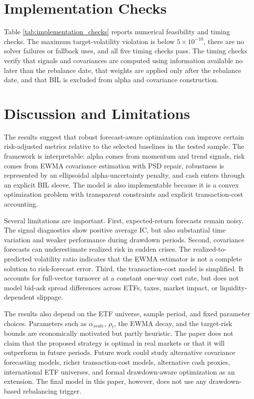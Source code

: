 \documentclass[11pt]{article}
\begin{document}
\section{Implementation Checks}
\label{sec:checks}

\ImplementationChecksTable

Table \ref{tab:implementation_checks} reports numerical feasibility and timing
checks. The maximum target-volatility violation is below \(5\times10^{-10}\), there
are no solver failures or fallback uses, and all five timing checks pass. The timing
checks verify that signals and covariances are computed using information available
no later than the rebalance date, that weights are applied only after the rebalance
date, and that BIL is excluded from alpha and covariance construction.

\section{Discussion and Limitations}
\label{sec:discussion}

The results suggest that robust forecast-aware optimization can improve certain
risk-adjusted metrics relative to the selected baselines in the tested sample. The
framework is interpretable: alpha comes from momentum and trend signals, risk comes
from EWMA covariance estimation with PSD repair, robustness is represented by an
ellipsoidal alpha-uncertainty penalty, and cash enters through an explicit BIL
sleeve. The model is also implementable because it is a convex optimization problem
with transparent constraints and explicit transaction-cost accounting.

Several limitations are important. First, expected-return forecasts remain noisy.
The signal diagnostics show positive average IC, but also substantial time variation
and weaker performance during drawdown periods. Second, covariance forecasts can
underestimate realized risk in sudden crises. The realized-to-predicted volatility
ratio indicates that the EWMA estimator is not a complete solution to risk-forecast
error. Third, the transaction-cost model is simplified. It accounts for full-vector
turnover at a constant one-way cost rate, but does not model bid-ask spread
differences across ETFs, taxes, market impact, or liquidity-dependent slippage.

The results also depend on the ETF universe, sample period, and fixed parameter
choices. Parameters such as \(\alpha_{scale}\), \(\rho_t\), the EWMA decay, and the
target-risk bounds are economically motivated but partly heuristic. The paper does
not claim that the proposed strategy is optimal in real markets or that it will
outperform in future periods. Future work could study alternative covariance
forecasting models, richer transaction-cost models, alternative cash proxies,
international ETF universes, and formal drawdown-aware optimization as an extension.
The final model in this paper, however, does not use any drawdown-based rebalancing
trigger.
\end{document}
